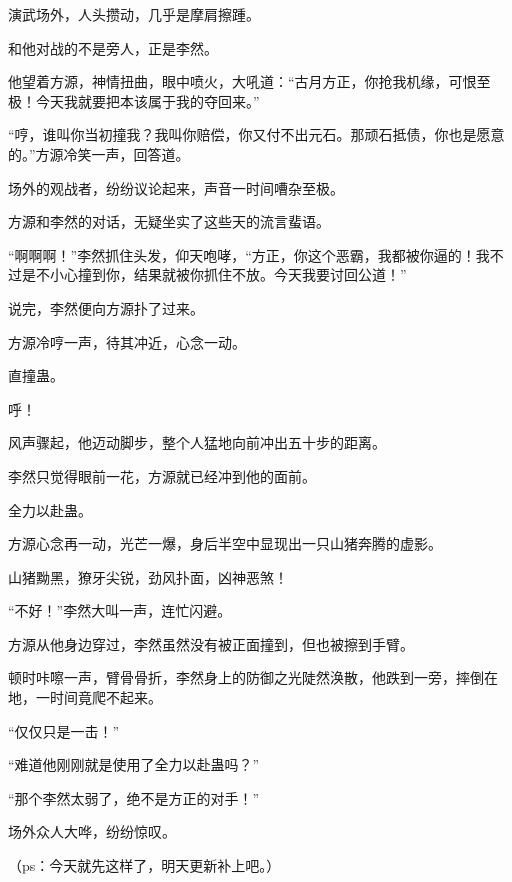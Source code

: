 \begin{this_body}
演武场外，人头攒动，几乎是摩肩擦踵。

和他对战的不是旁人，正是李然。

他望着方源，神情扭曲，眼中喷火，大吼道：“古月方正，你抢我机缘，可恨至极！今天我就要把本该属于我的夺回来。”

“哼，谁叫你当初撞我？我叫你赔偿，你又付不出元石。那顽石抵债，你也是愿意的。”方源冷笑一声，回答道。

场外的观战者，纷纷议论起来，声音一时间嘈杂至极。

方源和李然的对话，无疑坐实了这些天的流言蜚语。

“啊啊啊！”李然抓住头发，仰天咆哮，“方正，你这个恶霸，我都被你逼的！我不过是不小心撞到你，结果就被你抓住不放。今天我要讨回公道！”

说完，李然便向方源扑了过来。

方源冷哼一声，待其冲近，心念一动。

直撞蛊。

呼！

风声骤起，他迈动脚步，整个人猛地向前冲出五十步的距离。

李然只觉得眼前一花，方源就已经冲到他的面前。

全力以赴蛊。

方源心念再一动，光芒一爆，身后半空中显现出一只山猪奔腾的虚影。

山猪黝黑，獠牙尖锐，劲风扑面，凶神恶煞！

“不好！”李然大叫一声，连忙闪避。

方源从他身边穿过，李然虽然没有被正面撞到，但也被擦到手臂。

顿时咔嚓一声，臂骨骨折，李然身上的防御之光陡然涣散，他跌到一旁，摔倒在地，一时间竟爬不起来。

“仅仅只是一击！”

“难道他刚刚就是使用了全力以赴蛊吗？”

“那个李然太弱了，绝不是方正的对手！”

场外众人大哗，纷纷惊叹。

（ps：今天就先这样了，明天更新补上吧。）

\end{this_body}

